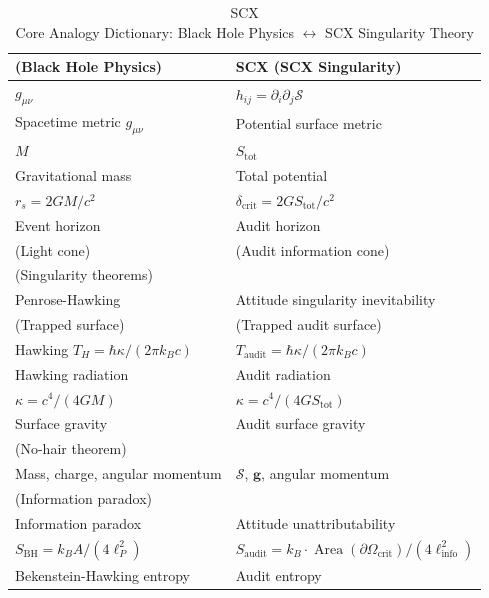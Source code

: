 \documentclass[12pt,a4paper]{article}
\theoremstyle{remark}
\newcommand{\g}{\mathbf{g}}
\DeclareMathOperator{\Area}{Area}
\newcommand{\cG}{G}          %
\newcommand{\cC}{c}          %
\newcommand{\cK}{\kappa}     %
\newcommand{\cH}{\hbar}      %
\begin{document}
\vspace{8pt}
\begin{table}[H]
\centering
\begin{tabular}{p{} p{}}
\toprule
\textbf{ (Black Hole Physics)} & \textbf{SCX (SCX Singularity)} \\
\midrule
 $g_{\mu\nu}$ &  $h_{ij} = \partial_i\partial_j\mathcal{S}$ \\
Spacetime metric $g_{\mu\nu}$ & Potential surface metric \\
\midrule
 $M$ &  $S_{\mathrm{tot}}$ \\
Gravitational mass & Total potential \\
\midrule
 $r_s = 2GM/c^2$ &  $\delta_{\mathrm{crit}} = 2\cG S_{\mathrm{tot}} / \cC^2$ \\
Event horizon & Audit horizon \\
\midrule
 (Light cone) &  (Audit information cone) \\
\midrule
 (Singularity theorems) &  \\
Penrose-Hawking & Attitude singularity inevitability \\
\midrule
 (Trapped surface) &  (Trapped audit surface) \\
\midrule
Hawking $T_H = \hbar\kappa/(2\pi k_B c)$ &  $T_{\mathrm{audit}} = \cH\cK/(2\pi k_B \cC)$ \\
Hawking radiation & Audit radiation \\
\midrule
 $\kappa = c^4/(4GM)$ &  $\cK = \cC^4/(4\cG S_{\mathrm{tot}})$ \\
Surface gravity & Audit surface gravity \\
\midrule
 (No-hair theorem) &  \\
Mass, charge, angular momentum & $\mathcal{S}$, $\g$, angular momentum \\
\midrule
 (Information paradox) &  \\
Information paradox & Attitude unattributability \\
\midrule
 $S_{\mathrm{BH}} = k_B A/(4\ell_P^2)$ &  $S_{\mathrm{audit}} = k_B \cdot \Area(\partial\Omega_{\mathrm{crit}})/(4\ell_{\mathrm{info}}^2)$ \\
Bekenstein-Hawking entropy & Audit entropy \\
\bottomrule
\end{tabular}
\caption{SCX \\
Core Analogy Dictionary: Black Hole Physics $\leftrightarrow$ SCX Singularity Theory}
\label{tab:analogy}
\end{table}
\end{document}
